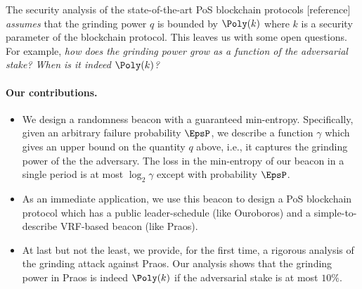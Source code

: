 The security analysis of the state-of-the-art PoS blockchain protocols [reference] 
\emph{assumes} that the grinding power $q$ is bounded by $\Poly(k)$ 
where $k$ is a security parameter of the blockchain protocol. 
This leaves us with some open questions. For example, 
\emph{how does the grinding power grow as a function of the adversarial stake? 
When is it indeed $\Poly(k)$?}

\paragraph{Our contributions.} 
\begin{itemize}
    \item We design a randomness beacon with a guaranteed min-entropy. 
    Specifically, given an arbitrary failure probability $\EpsP$, 
    we describe a function $\gamma$ which gives an upper bound on the quantity $q$ above, i.e., 
    it captures the grinding power of the the adversary.
    The loss in the min-entropy of our beacon in a single period is at most $\log_2 \gamma$ except with probability $\EpsP$. 
    
    \item As an immediate application, we use this beacon to design a PoS blockchain protocol 
    which has a public leader-schedule (like Ouroboros) and a simple-to-describe VRF-based beacon (like Praos).
    
    \item At last but not the least, we provide, for the first time, a rigorous analysis of the grinding attack 
    against Praos. 
    Our analysis shows that the grinding power in Praos is indeed $\Poly(k)$ if the adversarial stake is at most $10\%$.
\end{itemize}

